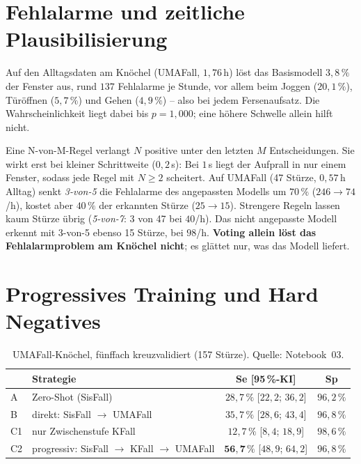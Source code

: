 \documentclass[11pt,a4paper,oneside,parskip=half,open=any,
               numbers=noenddot,listof=totoc,bibliography=totoc]{scrreprt}
\begin{document}
\section{Fehlalarme und zeitliche Plausibilisierung}
Auf den Alltagsdaten am Knöchel (UMAFall, $1{,}76$\,h) löst das
Basismodell $3{,}8\,\%$ der Fenster aus, rund $137$ Fehlalarme je Stunde,
vor allem beim Joggen ($20{,}1\,\%$), Türöffnen ($5{,}7\,\%$) und Gehen
($4{,}9\,\%$) -- also bei jedem Fersenaufsatz. Die Wahrscheinlichkeit liegt dabei bis $p = 1{,}000$;
eine höhere Schwelle allein hilft nicht.

Eine N-von-M-Regel verlangt $N$ positive unter den letzten $M$
Entscheidungen. Sie wirkt erst bei kleiner Schrittweite ($0{,}2$\,s):
Bei $1$\,s liegt der Aufprall in nur einem Fenster, sodass jede Regel mit
$N \geq 2$ scheitert. Auf UMAFall (47 Stürze, $0{,}57$\,h Alltag)
senkt \emph{3-von-5} die Fehlalarme des angepassten Modells um $70\,\%$
($246 \rightarrow 74$/h), kostet aber $40\,\%$ der erkannten Stürze
($25 \rightarrow 15$). Strengere Regeln lassen kaum Stürze übrig
(\emph{5-von-7}: 3 von 47 bei $40$/h). Das nicht angepasste Modell
erkennt mit 3-von-5 ebenso 15 Stürze, bei $98$/h. \textbf{Voting allein
löst das Fehlalarmproblem am Knöchel nicht}; es glättet nur, was das
Modell liefert.

\section{Progressives Training und Hard Negatives}
\begin{table}[H]
\centering\small
\caption{UMAFall-Knöchel, fünffach kreuzvalidiert (157 Stürze). Quelle: Notebook~03.}
\label{tab:prog}
\begin{tabularx}{\textwidth}{l Y c c}
\toprule
& \textbf{Strategie} & \textbf{Se [95\,\%-KI]} & \textbf{Sp} \\
\midrule
A  & Zero-Shot (SisFall)                          & $28{,}7\,\%$ [$22{,}2$; $36{,}2$] & $96{,}2\,\%$ \\
B  & direkt: SisFall $\rightarrow$ UMAFall          & $35{,}7\,\%$ [$28{,}6$; $43{,}4$] & $96{,}8\,\%$ \\
C1 & nur Zwischenstufe KFall                         & $12{,}7\,\%$ [$8{,}4$; $18{,}9$] & $98{,}6\,\%$ \\
C2 & progressiv: SisFall $\rightarrow$ KFall $\rightarrow$ UMAFall & $\mathbf{56{,}7\,\%}$ [$48{,}9$; $64{,}2$] & $96{,}8\,\%$ \\
\bottomrule
\end{tabularx}
\end{table}
\end{document}
